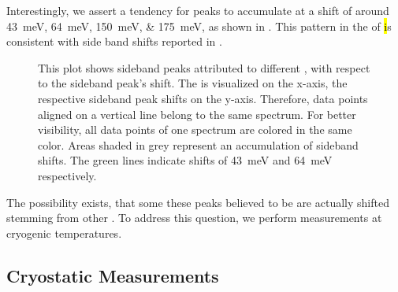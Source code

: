 		Interestingly, we assert a tendency for peaks to accumulate at a shift of around \SIlist{43;64;150;175}{meV}, as shown in . This pattern in the \psb of \hl is consistent with side band shifts reported in \cite{Sternschulte1994,Zaitsev2000, Neu2011}.

		\begin{figure}[!htb]
			\centering
			\caption[Accumulation of sideband peaks]{This plot shows sideband peaks attributed to different \ZPL \cwls, with respect to the sideband peak's shift. The \ZPL \cwl is visualized on the x-axis, the respective sideband peak shifts on the y-axis. Therefore, data points aligned on a vertical line belong to the same spectrum. For better visibility, all data points of one spectrum are colored in the same color. Areas shaded in grey represent an accumulation of sideband shifts. The green lines indicate shifts of \SI{43}{meV} and \SI{64}{meV} respectively.}
			\label{fig::multiple_sb_peaks}
		\end{figure}

		The possibility exists, that some these peaks believed to be \psbs are actually shifted \ZPLs stemming from other \sivs. To address this question, we perform \pl measurements at cryogenic temperatures.


		\subsection{Cryostatic Measurements}\label{subsec::cryo}

